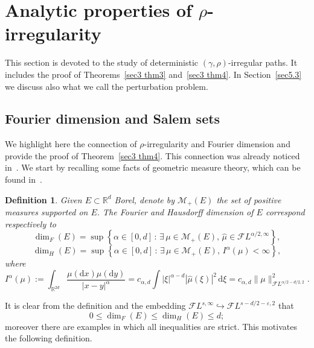 \documentclass[10pt]{article}
\newcommand{\assign}{:=}
\newcommand{\mathd}{\mathrm{d}}
\newtheorem{definition}[theorem]{Definition}
\begin{document}
\section{Analytic properties of $\rho$-irregularity}\label{sec5}

This section is devoted to the study of deterministic $(\gamma,
\rho)$\mbox{-}irregular paths. It includes the proof of Theorems~\ref{sec3
thm3} and~\ref{sec3 thm4}. In Section~\ref{sec5.3} we discuss also what we
call the perturbation problem.

\subsection{Fourier dimension and Salem sets}\label{sec5.1}

We highlight here the connection of $\rho$\mbox{-}irregularity and Fourier
dimension and provide the proof of Theorem~\ref{sec3 thm4}. This connection
was already noticed in~{\cite{choukgubinelli2}}. We start by recalling some
facts of geometric measure theory, which can be found in~{\cite{mattila}}.

\begin{definition}
  Given $E \subset \mathbb{R}^d$ Borel, denote by $\mathcal{M}_+ (E)$ the set
  of positive measures supported on $E$. The Fourier and Hausdorff dimension
  of $E$ correspond respectively to
  \[ \dim_F (E) = \sup \left\{ \alpha \in [0, d] \, : \, \exists \, \mu \in
     \mathcal{M}_+ (E), \, \hat{\mu} \in \mathcal{F} L^{\alpha / 2, \infty}
     \right\}, \]
  \[ \dim_H (E) = \sup \left\{ \alpha \in [0, d] \, : \, \exists \, \mu \in
     \mathcal{M}_+ (E), \, I^{\alpha} (\mu) < \infty \right\}, \]
  where
  \[ I^{\alpha} (\mu) \assign \int_{\mathbb{R}^{2 d}} \frac{\mu (\mathd x) \mu
     (\mathd y)}{| x - y |^{\alpha}} = c_{\alpha, d} \int | \xi |^{\alpha - d}
     | \hat{\mu} (\xi) |^2 \, \mathd \xi = c_{\alpha, d} \| \mu
     \|^2_{\mathcal{F} L^{\alpha / 2 - d / 2, 2}} . \]
\end{definition}

It is clear from the definition and the embedding $\mathcal{F} L^{s, \infty}
\hookrightarrow \mathcal{F} L^{s - d / 2 - \varepsilon, 2}$ that
\begin{equation}
  0 \leqslant \dim_F (E) \leqslant \dim_H (E) \leqslant d ; \label{sec 5.1
  relation dimensions}
\end{equation}
moreover there are examples in which all inequalities are strict. This
motivates the following definition.
\end{document}
